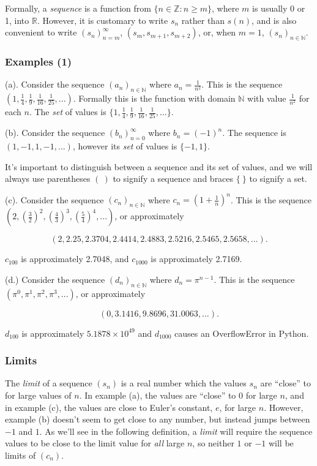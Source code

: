\documentclass[]{article}
\begin{document}
Formally, a \emph{sequence} is a function from
$\{ n \in \mathbb{Z}: n \ge m\}$, where $m$ is usually 0 or 1, into
$\mathbb{R}$. However, it is customary to write $s_n$ rather than
$s(n)$, and is also convenient to write $(s_n)_{n=m}^{\infty}$,
$(s_m, s_{m+1}, s_{m+2})$, or, when $m = 1$, $(s_n)_{n \in \mathbb{N}}$.

\subsubsection{Examples (1)}

(a). Consider the sequence $(a_n)_{n \in \mathbb{N}}$ where
$a_n = \frac{1}{n^2}$. This is the sequence
$(1, \frac{1}{4}, \frac{1}{9}, \frac{1}{16}, \frac{1}{25}, ...)$.
Formally this is the function with domain $\mathbb{N}$ with value
$\frac{1}{n^2}$ for each $n$. The \emph{set} of values is
$\{1, \frac{1}{4}, \frac{1}{9}, \frac{1}{16}, \frac{1}{25}, ...\}$.

(b). Consider the sequence $(b_n)_{n = 0}^{\infty}$ where
$b_n = (-1)^n$. The sequence is $(1,-1,1,-1,...)$, however its
\emph{set} of values is $\{-1,1\}$.

It's important to distinguish between a sequence and its set of values,
and we will always use parentheses $( \ )$ to signify a sequence and
braces $\{ \ \}$ to signify a set.

(c). Consider the sequence $(c_n)_{n \in \mathbb{N}}$ where
$c_n = (1 + \frac{1}{n})^n$. This is the sequence
$(2, (\frac{3}{2})^2, (\frac{4}{3})^3, (\frac{5}{4})^4, ...)$, or
approximately

\[ (2, 2.25, 2.3704, 2.4414, 2.4883, 2.5216, 2.5465, 2.5658, ...). \]

$c_{100}$ is approximately 2.7048, and $c_{1000}$ is approximately
2.7169.

(d.) Consider the sequence $(d_n)_{n \in \mathbb{N}}$ where
$d_n = \pi^{n-1}$. This is the sequence
$(\pi^0, \pi^1, \pi^2, \pi^3, ...)$, or approximately

\[ (0, 3.1416, 9.8696, 31.0063, ...). \]

$d_{100}$ is approximately $5.1878 \times 10^{49}$ and $d_{1000}$ causes
an OverflowError in Python.

\subsubsection{Limits}

The \emph{limit} of a sequence $(s_n)$ is a real number which the values
$s_n$ are ``close'' to for large values of $n$. In example (a), the
values are ``close'' to 0 for large $n$, and in example (c), the values
are close to Euler's constant, $e$, for large $n$. However, example (b)
doesn't seem to get close to any number, but instead jumps between $-1$
and $1$. As we'll see in the following definition, a \emph{limit} will
require the sequence values to be close to the limit value for
\emph{all} large $n$, so neither $1$ or $-1$ will be limits of $(c_n)$.
\end{document}
